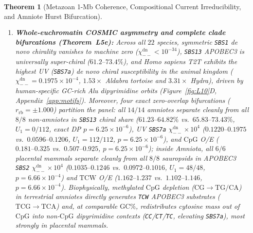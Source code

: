 \documentclass[11pt,a4paper]{article}
\renewcommand{\_}{\origunderscore\penalty200\relax}
\newtheorem{theorem}{Theorem}[section]
\theoremstyle{remark}
\begin{document}
\begin{theorem}[Metazoan 1-Mb Coherence, Compositional Current Irreducibility, and Amniote Hurst Bifurcation]
\begin{enumerate}
  \item \textbf{Whole-euchromatin COSMIC asymmetry and complete clade bifurcations (Theorem~L5e):} Across all $22$ species, symmetric \texttt{SBS1} de novo chirality vanishes to machine zero ($\chi_{--}^{\mathrm{dn}} < 10^{-34}$), \texttt{SBS13} APOBEC3 is universally super-chiral ($61.2\text{--}73.4\%$), and \textit{Homo sapiens} T2T exhibits the highest UV (\texttt{SBS7a}) de novo chiral susceptibility in the animal kingdom ($\chi_{--}^{\mathrm{dn}} = 0.1975\times 10^{-4}$, $1.53\times$ Aldabra tortoise and $3.31\times$ Hydra), driven by human-specific GC-rich \textit{Alu} dipyrimidine orbits (Figure~\ref{fig:L10}D, Appendix~\ref{app:motifs}). Moreover, four exact zero-overlap bifurcations ($r_{\mathrm{rb}} = \pm 1.000$) partition the panel: all $14/14$ amniotes separate cleanly from all $8/8$ non-amniotes in \texttt{SBS13} chiral share ($61.23\text{--}64.82\%$ vs.\ $65.83\text{--}73.43\%$, $U_1=0/112$, exact DP $p = 6.25\times 10^{-6}$), UV \texttt{SBS7a} $\chi_{--}^{\mathrm{dn}}\times 10^4$ ($0.1220\text{--}0.1975$ vs.\ $0.0596\text{--}0.1206$, $U_1=112/112$, $p = 6.25\times 10^{-6}$), and $\mathrm{CpG}$ O/E ($0.181\text{--}0.325$ vs.\ $0.507\text{--}0.925$, $p = 6.25\times 10^{-6}$); inside Amniota, all $6/6$ placental mammals separate cleanly from all $8/8$ sauropsids in APOBEC3 \texttt{SBS2} $\chi_{--}^{\mathrm{dn}}\times 10^4$ ($0.1035\text{--}0.1246$ vs.\ $0.0972\text{--}0.1016$, $U_1=48/48$, $p = 6.66\times 10^{-4}$) and $\mathrm{TCW}$ O/E ($1.162\text{--}1.237$ vs.\ $1.102\text{--}1.146$, $p = 6.66\times 10^{-4}$). Biophysically, methylated $\mathrm{CpG}$ depletion ($\mathrm{CG}\to\mathrm{TG/CA}$) in terrestrial amniotes directly generates \texttt{TCW} APOBEC3 substrates ($\mathrm{TCG}\to\mathrm{TCA}$) and, at comparable $\mathrm{GC}\%$, redistributes cytosine mass out of $\mathrm{CpG}$ into non-$\mathrm{CpG}$ dipyrimidine contexts (\texttt{CC}/\texttt{CT}/\texttt{TC}, elevating \texttt{SBS7a}), most strongly in placental mammals.
\end{enumerate}
\end{theorem}
\end{document}
